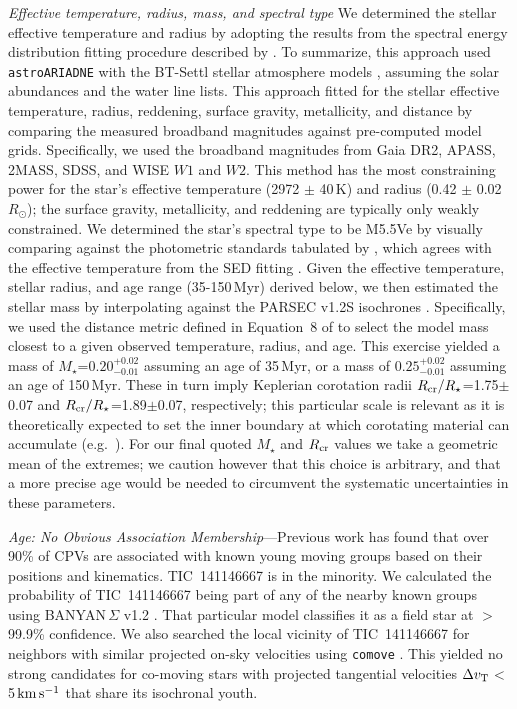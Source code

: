 \documentclass{nature3}
\newcommand{\kms}{\ensuremath{\rm km\,s^{-1}}}
\begin{document}
\begin{methods}
{\it Effective temperature, radius, mass, and spectral type}
We determined the stellar effective temperature and radius by adopting
the results from the spectral energy distribution fitting procedure
described by \cite{Bouma2024}.  To summarize, this approach used
\texttt{astroARIADNE} \cite{Vines2022} with the BT-Settl stellar
atmosphere models \cite{Allard2012}, assuming the \cite{Asplund2009}
solar abundances and the \cite{Barber2006} water line lists.  This
approach fitted for the stellar effective temperature, radius,
reddening, surface gravity, metallicity, and distance by comparing the
measured broadband magnitudes against pre-computed model grids.
Specifically, we used the broadband magnitudes from Gaia DR2, APASS,
2MASS, SDSS, and WISE $W1$ and $W2$.  This method has the most
constraining power for the star's effective temperature (2972 $\pm$
40\,K) and radius (0.42 $\pm$ 0.02\,$R_\odot$); the surface gravity,
metallicity, and reddening are typically only weakly constrained.  We
determined the star's spectral type to be M5.5Ve by visually comparing
against the photometric standards tabulated by \cite{Bochanski2007},
which agrees with the effective temperature from the SED fitting
\cite{Pecaut2013}.  Given the effective temperature, stellar radius, and
age range (35-150\,Myr) derived below, we then estimated the stellar
mass by interpolating against the PARSEC v1.2S isochrones
\cite{Chen2014}.  Specifically, we used the distance metric defined in
Equation~8 of \cite{Bouma2024} to select the model mass closest to a
given observed temperature, radius, and age.  This exercise yielded a
mass of $M_\star$=$0.20^{+0.02}_{-0.01}$ assuming an age of 35\,Myr, or
a mass of $0.25^{+0.02}_{-0.01}$ assuming an age of 150\,Myr.  
These in turn imply Keplerian corotation radii $R_{\rm
cr}/R_\star$=1.75$\pm$0.07 and $R_{\rm cr}/R_\star$=1.89$\pm$0.07,
respectively; this particular scale is relevant as it is theoretically
expected to set the inner boundary at which corotating material can
accumulate (e.g.~\cite{Townsend2005,Daley-Yates2024}).
For our final quoted $M_\star$ and $R_{\rm cr}$ values we take a
geometric mean of the extremes; we caution however that this choice is
arbitrary, and that a more precise age would be needed to circumvent
the systematic uncertainties in these parameters.


{\it Age: No Obvious Association Membership}---Previous work
\cite{Bouma2024} has found that over 90\% of CPVs are associated with
known young moving groups based on their positions and kinematics.
TIC~141146667 is in the minority.  We calculated the probability
of TIC~141146667 being part of any of the nearby known groups using
BANYAN\,$\Sigma$ v1.2 \cite{Gagne2018}.  That particular model
classifies it as a field star at $>$99.9\% confidence.  We also searched the
local vicinity of TIC~141146667 for neighbors with similar projected on-sky
velocities using \texttt{comove} \cite{Tofflemire2021}.  This yielded
no strong candidates for co-moving stars with
projected tangential velocities $\Delta v_{\rm T}$$<$5\,\kms
that share its isochronal youth.


\end{methods}
\end{document}
